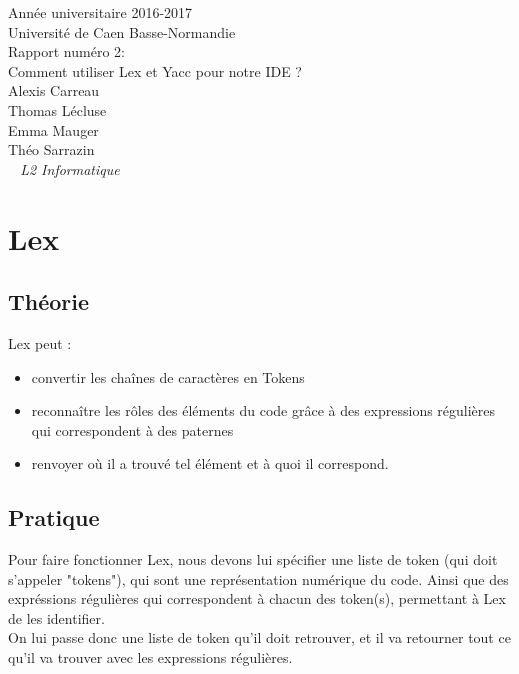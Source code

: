 \documentclass[a4paper,12pt]{article}
\begin{document}
\begin{titlepage}
	\begin{center}
		\Large{Année universitaire 2016-2017}\\
		\Large{Université de Caen Basse-Normandie}\\[1cm]
		
		\huge{Rapport numéro 2:}\\
		Comment utiliser Lex et Yacc pour notre IDE ?\\
		\vspace{3cm}
		Alexis Carreau\\
		Thomas Lécluse\\
		Emma Mauger\\
		Théo Sarrazin\\
	\normalsize{\textit{ ~ L2 Informatique}}\\
		\medskip
		\vspace{2cm}
		
	\end{center}
\end{titlepage}

\tableofcontents
\newpage

\section{Lex}
	
	\subsection{Théorie}
	Lex peut :
	\begin{itemize}
		\item convertir les chaînes de caractères en Tokens
		\item reconnaître les rôles des éléments du code grâce à des expressions régulières qui correspondent à des paternes
		\item renvoyer où il a trouvé tel élément et à quoi il correspond.
	\end{itemize}
	
	\subsection{Pratique}

	Pour faire fonctionner Lex, nous devons lui spécifier une liste de token (qui doit s'appeler "tokens"), qui sont une représentation numérique du code. Ainsi que des expréssions régulières qui correspondent à chacun des token(s), permettant à Lex de les identifier. \\
	On lui passe donc une liste de token qu'il doit retrouver, et il va retourner tout ce qu'il va trouver avec les expressions régulières.
	
\end{document}
